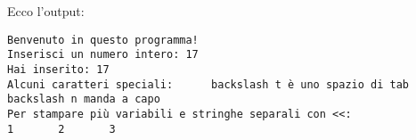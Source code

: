 	Ecco l'output:
	\begin{shaded}
\begin{verbatim}
Benvenuto in questo programma!                                                                                                                                          
Inserisci un numero intero: 17                                                                                                                                          
Hai inserito: 17                                                                                                                                                        
Alcuni caratteri speciali:      backslash t è uno spazio di tab                                                                                                         
backslash n manda a capo                                                                                                                                                
Per stampare più variabili e stringhe separali con <<:                                                                                                                  
1       2       3     
\end{verbatim}
	\end{shaded}
